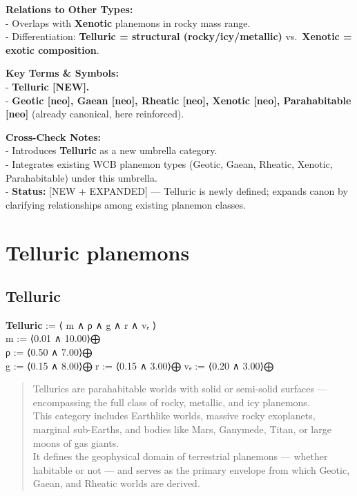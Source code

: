 \documentclass[
  letterpaper,
]{book}
\begin{document}
\textbf{Relations to Other Types:}\\
- Overlaps with \textbf{Xenotic} planemons in rocky mass range.\\
- Differentiation: \textbf{Telluric = structural (rocky/icy/metallic)}
vs.~\textbf{Xenotic = exotic composition}.

\textbf{Key Terms \& Symbols:}\\
- \textbf{Telluric {[}NEW{]}.}\\
- \textbf{Geotic {[}neo{]}, Gaean {[}neo{]}, Rheatic {[}neo{]}, Xenotic
{[}neo{]}, Parahabitable {[}neo{]}} (already canonical, here
reinforced).

\textbf{Cross-Check Notes:}\\
- Introduces \textbf{Telluric} as a new umbrella category.\\
- Integrates existing WCB planemon types (Geotic, Gaean, Rheatic,
Xenotic, Parahabitable) under this umbrella.\\
- \textbf{Status:} {[}NEW + EXPANDED{]} --- Telluric is newly defined;
expands canon by clarifying relationships among existing planemon
classes.

\chapter{Telluric planemons}\label{telluric-planemons}

\section{Telluric}\label{telluric}

\textbf{Telluric} := ⟨ m ∧ ρ ∧ g ∧ r ∧ vₑ ⟩\\
m := ⟨0.01 ∧ 10.00⟩⨁\\
ρ := ⟨0.50 ∧ 7.00⟩⨁\\
g := ⟨0.15 ∧ 8.00⟩⨁ r := ⟨0.15 ∧ 3.00⟩⨁ vₑ := ⟨0.20 ∧ 3.00⟩⨁

\begin{quote}
Tellurics are parahabitable worlds with solid or semi-solid surfaces ---
encompassing the full class of rocky, metallic, and icy planemons.\\
This category includes Earthlike worlds, massive rocky exoplanets,
marginal sub-Earths, and bodies like Mars, Ganymede, Titan, or large
moons of gas giants.\\
It defines the geophysical domain of terrestrial planemons --- whether
habitable or not --- and serves as the primary envelope from which
Geotic, Gaean, and Rheatic worlds are derived.
\end{quote}
\end{document}
